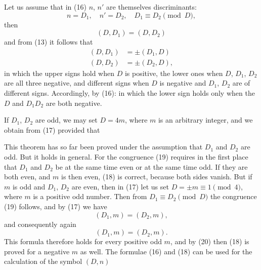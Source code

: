 Let us assume that in (16) $n$, $n'$ are themselves discriminants:
\[
n = D_1, \quad n' = D_2, \quad D_1 \equiv D_2 \pmod{D},
\]
then
\[
(D, D_1) = (D, D_2)
\]
and from (13) it follows that
\[
\begin{aligned}
(D, D_1) &= \pm(D_1, D) \\
(D, D_2) &= \pm(D_2, D),
\end{aligned}
\]
in which the upper signs hold when $D$ is positive, the lower ones when $D$, $D_1$, $D_2$ are all three negative, and different signs when $D$ is negative and $D_1$, $D_2$ are of different signs. Accordingly, by (16):
in which the lower sign holds only when the  $D$ and $D_1 D_2$ are both negative.

If $D_1$, $D_2$ are odd, we may set $D = 4m$, where $m$ is an arbitrary integer, and we obtain from (17)
provided that

This theorem has so far been proved under the assumption that $D_1$ and $D_2$ are odd. But it holds in general. For the congruence (19) requires in the first place that $D_1$ and $D_2$ be at the same time even or at the same time odd. If they are both even, and $m$ is then even, (18) is correct, because both sides vanish. But if $m$ is odd and $D_1$, $D_2$ are even, then in (17) let us set $D = \pm m \equiv 1 \pmod{4}$, where $m$ is a positive odd number. Then from $D_1 \equiv D_2 \pmod{D}$ the congruence (19) follows, and by (17) we have
\[
(D_1, m) = (D_2, m),
\]
and consequently again
\[
(D_1, m) = (D_2, m).
\]
This formula therefore holds for every positive odd $m$, and by (20) then (18) is proved for a negative $m$ as well. The formulae (16) and (18) can be used for the calculation of the symbol $(D, n)$
